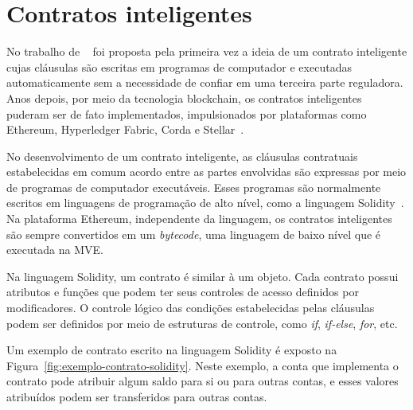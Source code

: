 
\section{Contratos inteligentes} \label{tex:fund:ethereum:smartc}

No trabalho de ~ foi proposta pela primeira vez a ideia de um contrato inteligente cujas cláusulas são escritas em programas de computador e executadas automaticamente sem a necessidade de confiar em uma terceira parte reguladora. Anos depois, por meio da tecnologia blockchain, os contratos inteligentes puderam ser de fato implementados, impulsionados por plataformas como Ethereum, Hyperledger Fabric, Corda e Stellar~\cite{overview-smartcontracts2020zheng}.

No desenvolvimento de um contrato inteligente, as cláusulas contratuais estabelecidas em comum acordo entre as partes envolvidas são expressas por meio de programas de computador executáveis. Esses programas são normalmente escritos em linguagens de programação de alto nível, como a linguagem Solidity~\cite{solidity-documentation}. Na plataforma Ethereum, independente da linguagem, os contratos inteligentes são sempre convertidos em um \textit{bytecode}, uma linguagem de baixo nível que é executada na MVE.

Na linguagem Solidity, um contrato é similar à um objeto. Cada contrato possui atributos e funções que podem ter seus controles de acesso definidos por modificadores. O controle lógico das condições estabelecidas pelas cláusulas podem ser definidos por meio de estruturas de controle, como \textit{if}, \textit{if-else}, \textit{for}, etc.

Um exemplo de contrato escrito na linguagem Solidity é exposto na Figura~\ref{fig:exemplo-contrato-solidity}. Neste exemplo, a conta que implementa o contrato pode atribuir algum saldo para si ou para outras contas, e esses valores atribuídos podem ser transferidos para outras contas.

